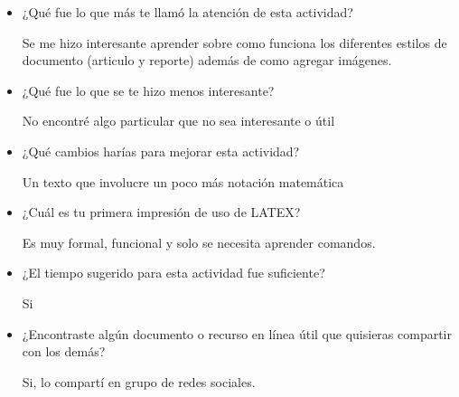 \documentclass[11pt]{article}
\begin{document}
\begin{itemize}
\item  ¿Qué fue lo que más te llamó la atención de esta actividad?

Se me hizo interesante aprender sobre como funciona los diferentes estilos de documento (articulo y reporte) además de como agregar imágenes.

\item  ¿Qué fue lo que se te hizo menos interesante?

No encontré algo particular que no sea interesante o útil

\item  ¿Qué cambios harías para mejorar esta actividad? 

Un texto que involucre un poco más notación matemática

\item  ¿Cuál es tu primera impresión de uso de LATEX?

Es muy formal, funcional y solo se necesita aprender comandos.

\item  ¿El tiempo sugerido para esta actividad fue suficiente? 

Si

\item  ¿Encontraste algún documento o recurso en línea útil que quisieras compartir con los demás?

Si, lo compartí en grupo de redes sociales.

\end{itemize}
\end{document}
